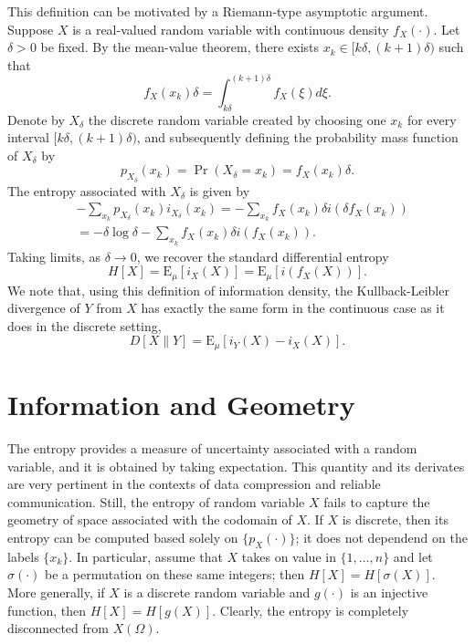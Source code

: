 This definition can be motivated by a Riemann-type asymptotic argument.
Suppose $X$ is a real-valued random variable with continuous density $f_X (\cdot)$.
Let $\delta > 0$ be fixed.
By the mean-value theorem, there exists $x_k \in [ k \delta , (k+1) \delta )$ such that
\begin{equation*}
f_X (x_k) \delta = \int_{k \delta}^{(k+1) \delta} f_X (\xi) d\xi .
\end{equation*}
Denote by $X_{\delta}$ the discrete random variable created by choosing one $x_k$ for every interval $[ k \delta , (k+1) \delta )$, and subsequently defining the probability mass function of $X_{\delta}$ by
\begin{equation*}
p_{X_{\delta}} (x_k) = \Pr (X_{\delta} = x_k) = f_X (x_k) \delta .
\end{equation*}
The entropy associated with $X_{\delta}$ is given by
\begin{equation*}
\begin{split}
&- \sum_{x_k} p_{X_{\delta}} (x_k) i_{X_{\delta}} (x_k)
= - \sum_{x_k} f_X (x_k) \delta i \left( \delta f_X (x_k) \right) \\
&= - \delta \log \delta
- \sum_{x_k} f_X (x_k) \delta i \left( f_X (x_k) \right) .
\end{split}
\end{equation*}
Taking limits, as $\delta \rightarrow 0$, we recover the standard differential entropy
\begin{equation*}
H [X] = \mathrm{E}_{\mu} \left[ i_X (X) \right]
= \mathrm{E}_{\mu} \left[ i (f_X(X)) \right] .
\end{equation*}
We note that, using this definition of information density, the Kullback-Leibler divergence of $Y$ from $X$ has exactly the same form in the continuous case as it does in the discrete setting,
\begin{equation*}
D[X \| Y] = \mathrm{E}_{\mu} \left[ i_Y(X) - i_X (X) \right] .
\end{equation*}


\section{Information and Geometry}

The entropy provides a measure of uncertainty associated with a random variable, and it is obtained by taking expectation.
This quantity and its derivates are very pertinent in the contexts of data compression and reliable communication.
Still, the entropy of random variable $X$ fails to capture the geometry of space associated with the codomain of $X$.
If $X$ is discrete, then its entropy can be computed based solely on $\{ p_X (\cdot) \}$;
it does not dependend on the labels $\{ x_k \}$.
In particular, assume that $X$ takes on value in $\{ 1, \ldots, n \}$ and let $\sigma (\cdot)$ be a permutation on these same integers; then $H [X] = H [\sigma(X)]$.
More generally, if $X$ is a discrete random variable and $g(\cdot)$ is an injective function, then $H[X] = H[g(X)]$.
Clearly, the entropy is completely disconnected from $X(\Omega)$.

